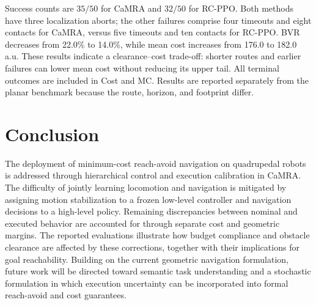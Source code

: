 \documentclass[conference]{IEEEtran}
\begin{document}
Success counts are $35/50$ for CaMRA and $32/50$ for RC-PPO. Both methods
have three localization aborts; the other failures comprise four timeouts and eight contacts
for CaMRA, versus five timeouts and ten contacts for RC-PPO. BVR decreases
from 22.0\% to 14.0\%, while mean cost increases from 176.0 to 182.0 a.u.
These results indicate a clearance--cost trade-off: shorter routes and
earlier failures can lower mean cost without reducing its upper tail.
All terminal outcomes are included in Cost and MC. Results are reported separately
from the planar benchmark because the route, horizon, and footprint differ.

\section{Conclusion}
The deployment of minimum-cost reach-avoid navigation on quadrupedal robots is
addressed through hierarchical control and execution calibration in CaMRA. The
difficulty of jointly learning locomotion and navigation is mitigated by assigning
motion stabilization to a frozen low-level controller and navigation decisions to
a high-level policy. Remaining discrepancies between nominal and executed behavior
are accounted for through separate cost and geometric margins. The reported
evaluations illustrate how budget compliance and obstacle clearance are affected
by these corrections, together with their implications for goal reachability.
Building on the current geometric navigation formulation, future work will be
directed toward semantic task understanding and a stochastic formulation in which
execution uncertainty can be incorporated into formal reach-avoid and cost
guarantees.

\IEEEtriggercmd{\balance}


\end{document}
